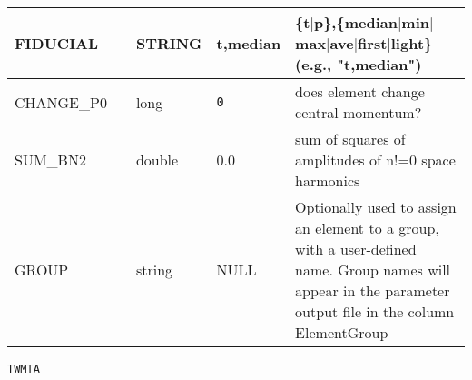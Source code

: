 \begin{tabular}{|l|l|l|l|p{\descwidth}|}
FIDUCIAL &  & STRING &   t,median        & \{t$|$p\},\{median$|$min$|$max$|$ave$|$first$|$light\} (e.g., "t,median")  \\ \hline 
CHANGE\_P0 &  & long &  \verb|0| & does element change central momentum?  \\ \hline 
SUM\_BN2 &  & double &  0.0 & sum of squares of amplitudes of n!=0 space harmonics  \\ \hline 
GROUP &  & string & NULL & Optionally used to assign an element to a group, with a user-defined name.  Group names will appear in the parameter output file in the column ElementGroup  \\ \hline 
\end{tabular}

\newpage
\begin{center}{\Large\verb|TWMTA|}\end{center}
